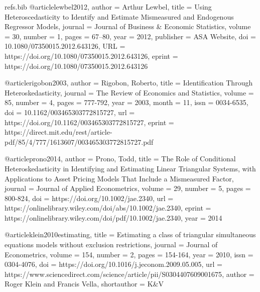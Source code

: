 \begin{filecontents}[force]{refs.bib}
@article{lewbel2012,
author = {Arthur Lewbel},
title = {Using Heteroscedasticity to Identify and Estimate Mismeasured and Endogenous Regressor Models},
journal = {Journal of Business \& Economic Statistics},
volume = {30},
number = {1},
pages = {67--80},
year = {2012},
publisher = {ASA Website},
doi = {10.1080/07350015.2012.643126},
URL = {https://doi.org/10.1080/07350015.2012.643126},
eprint = {https://doi.org/10.1080/07350015.2012.643126}
}

@article{rigobon2003,
    author = {Rigobon, Roberto},
    title = {Identification Through Heteroskedasticity},
    journal = {The Review of Economics and Statistics},
    volume = {85},
    number = {4},
    pages = {777-792},
    year = {2003},
    month = {11},
    issn = {0034-6535},
    doi = {10.1162/003465303772815727},
    url = {https://doi.org/10.1162/003465303772815727},
    eprint = {https://direct.mit.edu/rest/article-pdf/85/4/777/1613607/003465303772815727.pdf}
}

@article{prono2014,
author = {Prono, Todd},
title = {The Role of Conditional Heteroskedasticity in Identifying and Estimating Linear Triangular Systems, with Applications to Asset Pricing Models That Include a Mismeasured Factor},
journal = {Journal of Applied Econometrics},
volume = {29},
number = {5},
pages = {800-824},
doi = {https://doi.org/10.1002/jae.2340},
url = {https://onlinelibrary.wiley.com/doi/abs/10.1002/jae.2340},
eprint = {https://onlinelibrary.wiley.com/doi/pdf/10.1002/jae.2340},
year = {2014}
}

@article{klein2010estimating,
title = {Estimating a class of triangular simultaneous equations models without exclusion restrictions},
journal = {Journal of Econometrics},
volume = {154},
number = {2},
pages = {154-164},
year = {2010},
issn = {0304-4076},
doi = {https://doi.org/10.1016/j.jeconom.2009.05.005},
url = {https://www.sciencedirect.com/science/article/pii/S0304407609001675},
author = {Roger Klein and Francis Vella},
shortauthor = {K\&V}
}

\end{filecontents}

\documentclass{article}
\usepackage{csquotes}
\usepackage[utf8]{inputenc}
\usepackage[T1]{fontenc}
\usepackage{mathtools}
\usepackage{amsmath}
\usepackage{amsthm}
\usepackage{amssymb}
\usepackage{geometry}
\geometry{verbose}

\usepackage[backend=biber, style=authoryear-comp]{biblatex}


